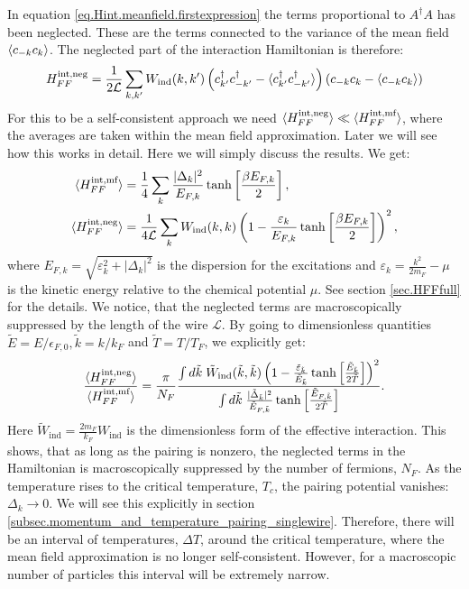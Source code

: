 In equation \eqref{eq.Hint.meanfield.firstexpression} the terms proportional to $A^\dagger A$ has been neglected. These are the terms connected to the variance of the mean field $\braket{c_{-k}c_k}$. The neglected part of the interaction Hamiltonian is therefore:
\begin{equation}
H^{\text{int,neg}}_{FF} = \frac{1}{2\mathcal{L}} \sum_{k, k'} W_{\text{ind}}(k, k') \left(c^\dagger_{k'} c^\dagger_{-k'} - \braket{c^\dagger_{k'} c^\dagger_{-k'}}  \right)\left( c_{-k}c_k - \braket{c_{-k}c_k} \right)
\end{equation}
For this to be a self-consistent approach we need $\braket{H^{\text{int,neg}}_{FF}} \ll \braket{H^{\text{int,mf}}_{FF}}$, where the averages are taken within the mean field approximation. Later we will see how this works in detail. Here we will simply discuss the results. We get:
\begin{align}
\braket{H^{\text{int,mf}}_{FF}}  &= \frac{1}{4}\sum_k \frac{|\Delta_k|^2}{E_{F,k}}\tanh\left[\frac{\beta E_{F,k}}{2}\right], \nonumber \\
\braket{H^{\text{int,neg}}_{FF}} &= \frac{1}{4\mathcal{L}}\sum_k W_{\text{ind}}(k, k)\left(1 - \frac{\varepsilon_k}{E_{F,k}}\tanh\left[\frac{\beta E_{F,k}}{2}\right]  \right)^2, \nonumber
\end{align}
where $E_{F,k} = \sqrt{\varepsilon^2_k + |\Delta_k|^2}$ is the dispersion for the excitations and $\varepsilon_k = \frac{k^2}{2m_F} - \mu$ is the kinetic energy relative to the chemical potential $\mu$. See section \ref{sec.HFFfull} for the details. We notice, that the neglected terms are macroscopically suppressed by the length of the wire $\mathcal{L}$. By going to dimensionless quantities $\tilde{E} = E / \epsilon_{F,0}, \tilde{k} = k / k_F$ and $\tilde{T} = T / T_F$, we explicitly get:
\begin{equation}
\frac{ \braket{ H^{\text{int,neg}}_{FF} } }{ \braket{ H^{\text{int,mf}}_{FF} } } = \frac{\pi}{N_F}\frac{   \int d\tilde{k}\; \tilde{W}_{\text{ind}}(\tilde{k}, \tilde{k}) \left( 1 - \frac{ \tilde{\varepsilon}_{\tilde{k}} }{ \tilde{E}_{\tilde{k}} }\tanh\left[\frac{ \tilde{E}_{\tilde{k}} }{ 2\tilde{T} }\right] \right)^2  }{  \int d\tilde{k}\; \frac{ |\tilde{\Delta}_{\tilde{k}}|^2 }{ \tilde{E}_{F,\tilde{k}} }\tanh\left[\frac{ \tilde{E}_{F,\tilde{k}} }{2 \tilde{T}}\right]   }.
\label{eq.selfconsistency.meanfieldapproximation}
\end{equation}
Here $\tilde{W}_{\text{ind}} = \frac{2m_F}{k_F}W_{\text{ind}}$ is the dimensionless form of the effective interaction. This shows, that as long as the pairing is nonzero, the neglected terms in the Hamiltonian is macroscopically suppressed by the number of fermions, $N_F$. As the temperature rises to the critical temperature, $T_c$, the pairing potential vanishes: $\Delta_k \to 0$. We will see this explicitly in section \ref{subsec.momentum_and_temperature_pairing_singlewire}. Therefore, there will be an interval of temperatures, $\Delta T$, around the critical temperature, where the mean field approximation is no longer self-consistent. However, for a macroscopic number of particles this interval will be extremely narrow. 

